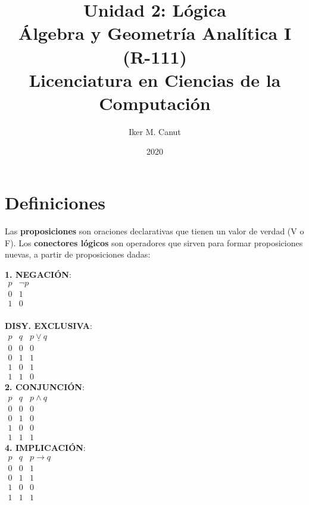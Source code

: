 \documentclass[11pt,a4paper]{article}
\author{Iker M. Canut}
\title{Unidad 2: L\'ogica\\\'Algebra y Geometr\'ia Anal\'itica I (R-111)\\Licenciatura en Ciencias de la Computaci\'on}
\date{2020}
\begin{document}
\maketitle
\newpage

\section{Definiciones}
\noindent Las \textbf{proposiciones} son oraciones declarativas que tienen un valor de verdad (V o F). Los \textbf{conectores l\'ogicos} son operadores que sirven para formar proposiciones nuevas, a partir de proposiciones dadas:
\begin{multicols}{3}
\noindent \textbf{1. NEGACI\'ON}:\\

\indent $\begin{array}{|c|c|}
p & \lnot p\\
\hline
0 & 1 \\
1 & 0
\end{array}$\\ \\

\noindent \textbf{DISY. EXCLUSIVA}: \\
\indent $\begin{array}{|cc|c|}
p & q & p \underline{\lor} q\\
\hline
0 & 0 & 0\\
0 & 1 & 1\\
1 & 0 & 1\\
1 & 1 & 0
\end{array}$\\

\noindent \textbf{2. CONJUNCI\'ON}:\\
\indent $\begin{array}{|cc|c|}
p & q & p \land q\\
\hline
0 & 0 & 0\\
0 & 1 & 0\\
1 & 0 & 0\\
1 & 1 & 1
\end{array}$\\

\noindent \textbf{4. IMPLICACI\'ON}: \\
\indent $\begin{array}{|cc|c|}
p & q & p \rightarrow q\\
\hline
0 & 0 & 1\\
0 & 1 & 1\\
1 & 0 & 0\\
1 & 1 & 1
\end{array}$\\


\end{multicols}
\end{document}
